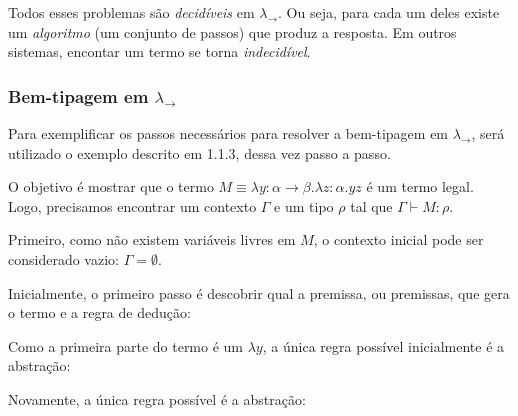 \documentclass[../main.tex]{subfiles}
\begin{document}
Todos esses problemas são \emph{decidíveis} em $\lambda_\to$. Ou seja, para cada um deles existe um \emph{algoritmo} (um conjunto de passos) que produz a resposta. Em outros sistemas, encontar um termo se torna \emph{indecidível}.

\subsubsection{Bem-tipagem em $\lambda_\to$}

Para exemplificar os passos necessários para resolver a bem-tipagem em $\lambda_\to$, será utilizado o exemplo descrito em 1.1.3, dessa vez passo a passo.

O objetivo é mostrar que o termo $M \equiv \lambda y : \alpha \to \beta . \lambda z : \alpha . yz$ é um termo legal. Logo, precisamos encontrar um contexto $\Gamma$ e um tipo $\rho$ tal que $\Gamma \vdash M : \rho$.

Primeiro, como não existem variáveis livres em $M$, o contexto inicial pode ser considerado vazio: $\Gamma = \emptyset$.

Inicialmente, o primeiro passo é descobrir qual a premissa, ou premissas, que gera o termo e a regra de dedução:

\begin{prooftree}
\end{prooftree}

Como a primeira parte do termo é um $\lambda y$, a única regra possível inicialmente é a abstração:

\begin{prooftree}
\end{prooftree}

Novamente, a única regra possível é a abstração:


\begin{prooftree}
\end{prooftree}
\end{document}
